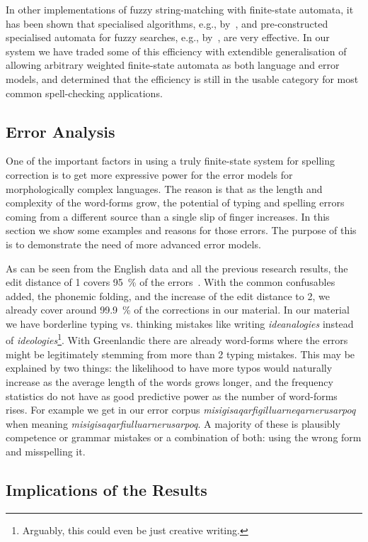 \documentclass[a4paper,12pt]{article}
\begin{document}
In other implementations of fuzzy string-matching with finite-state automata,
it has been shown that specialised algorithms, e.g., by~\cite{oflazer/1996},
and pre-constructed specialised automata for fuzzy searches, e.g.,
by~\cite{hulden/2009}, are very effective. In our system we have traded some of
this efficiency with extendible generalisation of allowing arbitrary weighted
finite-state automata as both language and error models, and determined that
the efficiency is still in the usable category for most common spell-checking
applications.

\subsection{Error Analysis}
\label{subsec:error-analysis}

One of the important factors in using a truly finite-state system for
spelling correction is to get more expressive power for the error models for
morphologically complex languages. The reason is that as the length and
complexity of the word-forms grow, the potential of typing and spelling errors
coming from a different source than a single slip of finger increases. In this
section we show some examples and reasons for those errors. The purpose of
this is to demonstrate the need of more advanced error models.

As can be seen from the English data and all the previous research results, the
edit distance of 1 covers 95~\% of the errors~\cite[]{damerau/1964}. With the
common confusables added, the phonemic folding, and the increase of the edit
distance to 2, we already cover around 99.9~\% of the corrections in our
material. In our material we have borderline typing vs. thinking
mistakes like writing \emph{ideanalogies} instead of
\emph{ideologies}\footnote{Arguably, this could even be just creative writing.}.
With Greenlandic there are already word-forms where the errors might be
legitimately stemming from more than 2 typing mistakes.
This may be explained by two things: the likelihood
to have more typos would naturally increase as the average length of the words
grows longer, and the frequency statistics do not have as good predictive power
as the number of word-forms rises. For example we get in our error corpus
\emph{misigisaqarfigilluarneqarnerusarpoq} when meaning
\emph{misigisaqarfiulluarnerusarpoq}. A majority of these is plausibly
competence or grammar mistakes or a combination of both: using the wrong form
and misspelling it.


\subsection{Implications of the Results}
\end{document}
